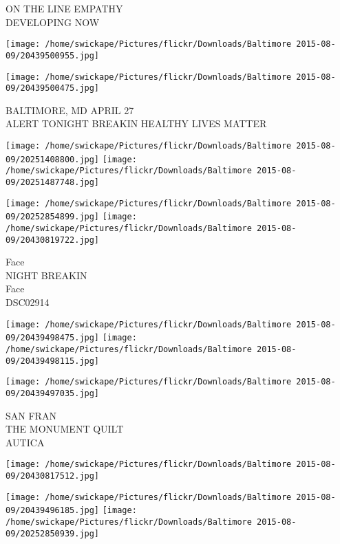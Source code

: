 \documentclass[10pt,letterpaper]{article}
\begin{document}
ON THE LINE EMPATHY\\
DEVELOPING NOW\\
\pagebreak

\texttt{[image: /home/swickape/Pictures/flickr/Downloads/Baltimore 2015-08-09/20439500955.jpg]}

\vspace{0.25in}
\texttt{[image: /home/swickape/Pictures/flickr/Downloads/Baltimore 2015-08-09/20439500475.jpg]}

BALTIMORE, MD APRIL 27\\
ALERT TONIGHT BREAKIN HEALTHY LIVES MATTER\\
\pagebreak

\texttt{[image: /home/swickape/Pictures/flickr/Downloads/Baltimore 2015-08-09/20251408800.jpg]}
\texttt{[image: /home/swickape/Pictures/flickr/Downloads/Baltimore 2015-08-09/20251487748.jpg]}

\texttt{[image: /home/swickape/Pictures/flickr/Downloads/Baltimore 2015-08-09/20252854899.jpg]}
\texttt{[image: /home/swickape/Pictures/flickr/Downloads/Baltimore 2015-08-09/20430819722.jpg]}

Face\\
NIGHT BREAKIN\\
Face\\
DSC02914\\
\pagebreak

\texttt{[image: /home/swickape/Pictures/flickr/Downloads/Baltimore 2015-08-09/20439498475.jpg]}
\texttt{[image: /home/swickape/Pictures/flickr/Downloads/Baltimore 2015-08-09/20439498115.jpg]}

\texttt{[image: /home/swickape/Pictures/flickr/Downloads/Baltimore 2015-08-09/20439497035.jpg]}

SAN FRAN\\
THE MONUMENT QUILT\\
AUTICA\\
\pagebreak

\texttt{[image: /home/swickape/Pictures/flickr/Downloads/Baltimore 2015-08-09/20430817512.jpg]}

\vspace{0.25in}
\texttt{[image: /home/swickape/Pictures/flickr/Downloads/Baltimore 2015-08-09/20439496185.jpg]}
\texttt{[image: /home/swickape/Pictures/flickr/Downloads/Baltimore 2015-08-09/20252850939.jpg]}
\end{document}
